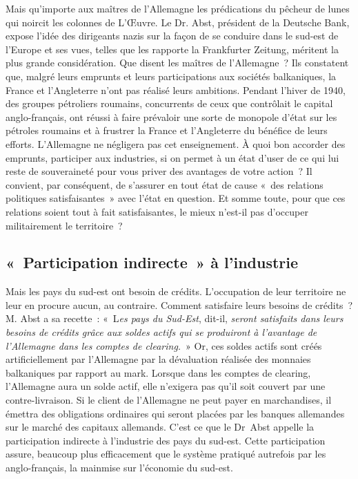 \documentclass[french,twoside]{book} %
\begin{document}
Mais qu’importe aux maîtres de l’Allemagne les prédications du pêcheur de lunes qui noircit les colonnes de L’Œuvre. Le Dr. Abst, président de la Deutsche Bank, expose l’idée des dirigeants nazis sur la façon de se conduire dans le sud-est de l’Europe et ses vues, telles que les rapporte la Frankfurter Zeitung, méritent la plus grande considération. Que disent les maîtres de l’Allemagne ? Ils constatent que, malgré leurs emprunts et leurs participations aux sociétés balkaniques, la France et l’Angleterre n’ont pas réalisé leurs ambitions. Pendant l’hiver de 1940, des groupes pétroliers roumains, concurrents de ceux que contrôlait le capital anglo-français, ont réussi à faire prévaloir une sorte de monopole d’état sur les pétroles roumains et à frustrer la France et l’Angleterre du bénéfice de leurs efforts. L’Allemagne ne négligera pas cet enseignement. À quoi bon accorder des emprunts, participer aux industries, si on permet à un état d’user de ce qui lui reste de souveraineté pour vous priver des avantages de votre action ? Il convient, par conséquent, de s’assurer en tout état de cause « des relations politiques satisfaisantes » avec l’état en question. Et somme toute, pour que ces relations soient tout à fait satisfaisantes, le mieux n’est-il pas d’occuper militairement le territoire ?
\subsection[« Participation indirecte » à l’industrie]{« Participation indirecte » à l’industrie}
\noindent Mais les pays du sud-est ont besoin de crédits. L’occupation de leur territoire ne leur en procure aucun, au contraire. Comment satisfaire leurs besoins de crédits ? M. Abst a sa recette : « L\emph{es pays du Sud-Est}, dit-il, \emph{seront satisfaits dans leurs besoins de crédits grâce aux soldes actifs qui se produiront à l’avantage de l’Allemagne dans les comptes de clearing.} » Or, ces soldes actifs sont créés artificiellement par l’Allemagne par la dévaluation réalisée des monnaies balkaniques par rapport au mark. Lorsque dans les comptes de clearing, l’Allemagne aura un solde actif, elle n’exigera pas qu’il soit couvert par une contre-livraison. Si le client de l’Allemagne ne peut payer en marchandises, il émettra des obligations ordinaires qui seront placées par les banques allemandes sur le marché des capitaux allemands. C’est ce que le Dr Abst appelle la participation indirecte à l’industrie des pays du sud-est. Cette participation assure, beaucoup plus efficacement que le système pratiqué autrefois par les anglo-français, la mainmise sur l’économie du sud-est.
\end{document}
